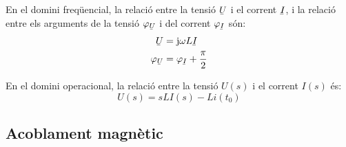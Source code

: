 En el domini freq\"{u}encial, la relaci\'{o} entre la tensi\'{o} $\cmplx{U}$ i el corrent $\cmplx{I}$, i la relaci\'{o} entre els arguments de la tensi\'{o} $\varphi_{\cmplx{U}}$ i del corrent $\varphi_{\cmplx{I}}$ s\'{o}n:
\begin{align}
   \cmplx{U} &= \ju \omega L \cmplx{I} \\
   \varphi_{\cmplx{U}} &= \varphi_{\cmplx{I}} + \frac{\pi}{2}
\end{align}

 En el domini operacional, la relaci\'{o} entre la tensi\'{o} $U(s)$ i el corrent $I(s)$ \'{e}s:
\begin{equation}
   U(s) = s L I(s) - L i(t_0)
\end{equation}


\subsection{Acoblament magn\`{e}tic} 

